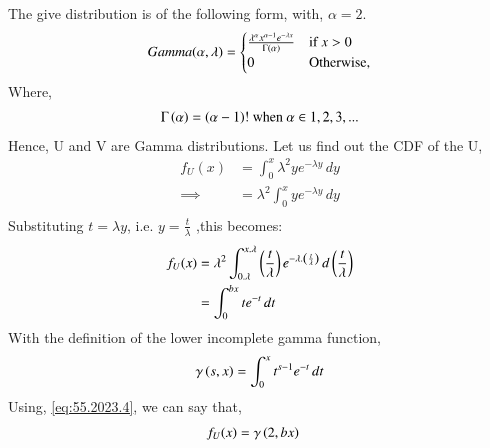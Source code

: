 \documentclass[journal,12pt,twocolumn]{IEEEtran}
\theoremstyle{remark}
\begin{document}
%

\solution 
The give distribution is of the following form, with, $\alpha = 2$. 
\begin{align}
Gamma(\alpha,\lambda) = 
\begin{cases}
\frac{\lambda^{\alpha}x^{\alpha-1}e^{-\lambda x}}{\Gamma\left(\alpha\right)} & \text{if } x > 0\\
0 & \text{Otherwise,}
\end{cases} \label{eq:55.2023.4}
\end{align}
Where, 
\begin{align}
\Gamma\left(\alpha\right) = \left(\alpha - 1\right)! \text{ when } \alpha \in {1,2,3,...}
\end{align}
Hence, U and V are Gamma distributions. Let us find out the CDF of the U,
\begin{align}
f_{U}(x) %
 &= \int_{0}^{x} \lambda^{2}ye^{-\lambda y} \, dy\\
\implies &= \lambda^{2} \int_{0}^{x} ye^{-\lambda y} \, dy\\						%
\end{align}
Substituting $t = \lambda y$, i.e. $y= \frac{t}{\lambda}$ ,this becomes:
\begin{align}
f_{U}(x) &= \lambda^{2} \int_{0.\lambda}^{x.\lambda} \left(\frac{t}{\lambda}\right) e^{-\lambda.\left(\frac{t}{\lambda}\right)} \, d\left(\frac{t}{\lambda}\right)\\
&= \int_{0}^{bx} t e^{-t} \,dt\\
\end{align}
With the definition of the lower incomplete gamma function,
\begin{align}
\gamma \left(s,x\right) = \int_{0}^{x} t^{s-1}e^{-t} \, dt\\
\end{align}
Using, \eqref{eq:55.2023.4}, we can say that,
\begin{align}
f_{U}(x) &= \gamma \left(2,bx\right)
\end{align}
\end{document}
